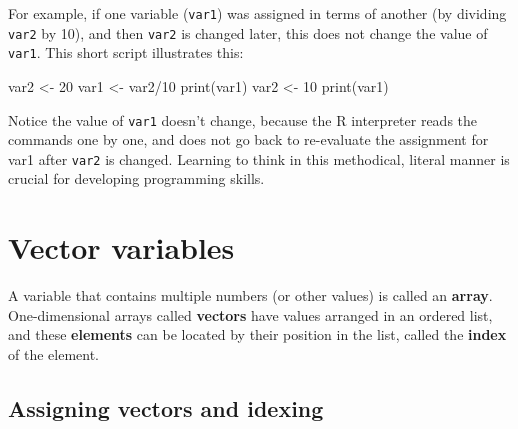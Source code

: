 \documentclass[
  letterpaper,
  DIV=11,
  numbers=noendperiod]{scrreprt}
\newenvironment{Shaded}{\begin{snugshade}}{\end{snugshade}}
\newcommand{\NormalTok}[1]{\textcolor[rgb]{0.00,0.23,0.31}{#1}}
\begin{document}
For example, if one variable (\texttt{var1}) was assigned in terms of
another (by dividing \texttt{var2} by 10), and then \texttt{var2} is
changed later, this does not change the value of \texttt{var1}. This
short script illustrates this:

\begin{Shaded}
\begin{Highlighting}[]
\NormalTok{var2 \textless{}{-} 20}
\NormalTok{var1 \textless{}{-} var2/10}
\NormalTok{print(var1)}
\NormalTok{var2 \textless{}{-} 10}
\NormalTok{print(var1)}
\end{Highlighting}
\end{Shaded}

Notice the value of \texttt{var1} doesn't change, because the R
interpreter reads the commands one by one, and does not go back to
re-evaluate the assignment for var1 after \texttt{var2} is changed.
Learning to think in this methodical, literal manner is crucial for
developing programming skills.

\hypertarget{vector-variables}{%
\section*{Vector variables}\label{vector-variables}}


\begin{tcolorbox}[enhanced jigsaw, arc=.35mm, colframe=quarto-callout-tip-color-frame, left=2mm, opacitybacktitle=0.6, breakable, title=\textcolor{quarto-callout-tip-color}{\faLightbulb}\hspace{0.5em}{Array variables}, toprule=.15mm, coltitle=black, bottomtitle=1mm, toptitle=1mm, colback=white, leftrule=.75mm, colbacktitle=quarto-callout-tip-color!10!white, titlerule=0mm, opacityback=0, rightrule=.15mm, bottomrule=.15mm]

A variable that contains multiple numbers (or other values) is called an
\textbf{array}. One-dimensional arrays called \textbf{vectors} have
values arranged in an ordered list, and these \textbf{elements} can be
located by their position in the list, called the \textbf{index} of the
element.

\end{tcolorbox}

\hypertarget{assigning-vectors-and-idexing}{%
\subsection*{Assigning vectors and
idexing}\label{assigning-vectors-and-idexing}}
\end{document}
